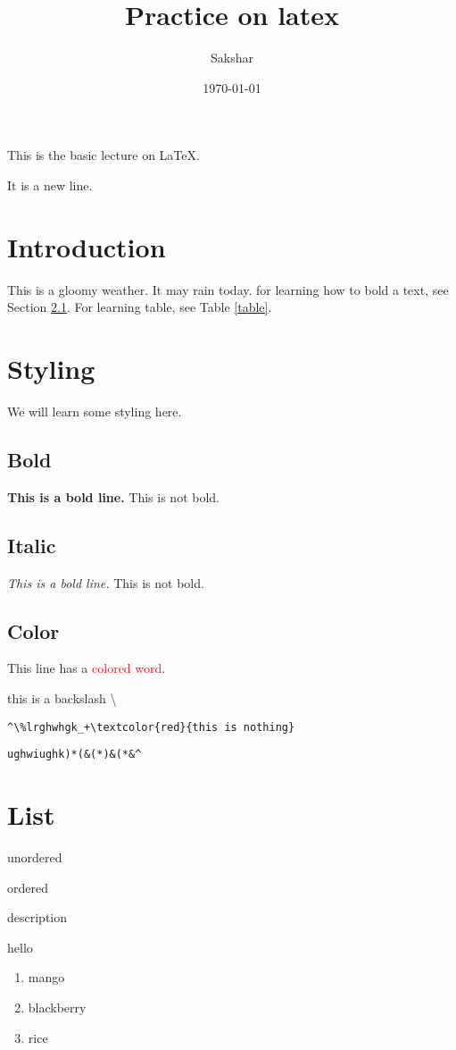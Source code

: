 \documentclass{article}
\title{Practice on latex}
\author{Sakshar}
\date{\today}
\begin{document}
\maketitle
\tableofcontents
This is the basic lecture on \LaTeX.

\noindent It is a new line.

\section{Introduction}

This is a gloomy weather. It may rain today.  for learning how to bold a text, see Section \ref{bold}. For learning table, see Table \ref{table}.

\section{Styling}
We will learn some styling here.

\subsection{Bold}\label{bold}
\textbf{This is a bold line.} This is not bold.

\subsection*{Italic}
\emph{This is a \emph{bold} line.} This is not bold.

\subsection{Color}
This line has a \textcolor{red}{colored word}.

this is a backslash \textbackslash

\verb|^\%lrghwhgk_+\textcolor{red}{this is nothing}|

\begin{verbatim}
ughwiughk)*(&(*)&(*&^
\end{verbatim}

\section{List}

unordered

\noindent ordered

description

hello

\begin{enumerate}
	\item mango
	\item blackberry
	\item rice
\end{enumerate}
\end{document}

